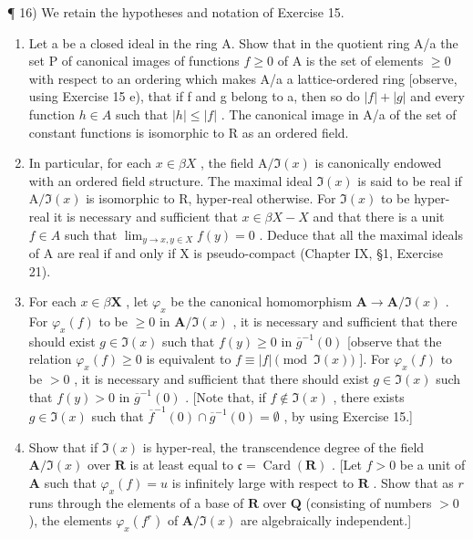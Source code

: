 ¶ 16) We retain the hypotheses and notation of Exercise 15.

\begin{enumerate}
\def\labelenumi{\alph{enumi})}
\item
  Let a be a closed ideal in the ring A. Show that in the quotient ring A/a the set P of canonical images of functions \(f \geqslant 0\) of A is the set of elements \(\geqslant 0\) with respect to an ordering which makes A/a a lattice-ordered ring {[}observe, using Exercise 15 e), that if f and g belong to a, then so do \(|f| + |g|\) and every function \(h \in A\) such that \(|h| \leqslant |f|\) . The canonical image in A/a of the set of constant functions is isomorphic to R as an ordered field.
\item
  In particular, for each \(x \in \beta X\) , the field \(\mathrm{A}/\Im(x)\) is canonically endowed with an ordered field structure. The maximal ideal \(\Im(x)\) is said to be real if \(\mathrm{A}/\Im(x)\) is isomorphic to R, hyper-real otherwise. For \(\Im(x)\) to be hyper-real it is necessary and sufficient that \(x \in \beta X - X\) and that there is a unit \(f \in A\) such that \(\lim_{y \to x, y \in X} f(y) = 0\) . Deduce that all the maximal ideals of A are real if and only if X is pseudo-compact (Chapter IX, §1, Exercise 21).
\item
  For each \(x \in \beta\mathbf{X}\) , let \(\varphi_x\) be the canonical homomorphism \(\mathbf{A} \to \mathbf{A}/\Im(x)\) . For \(\varphi_x(f)\) to be \(\geqslant 0\) in \(\mathbf{A}/\Im(x)\) , it is necessary and sufficient that there should exist \(g \in \Im(x)\) such that \(f(y) \geqslant 0\) in \(\overline{g}^{-1}(0)\) {[}observe that the relation \(\varphi_x(f) \geqslant 0\) is equivalent to \(f \equiv |f|\pmod{\Im(x)}\) {]}. For \(\varphi_x(f)\) to be \(>0\) , it is necessary and sufficient that there should exist \(g \in \Im(x)\) such that \(f(y) > 0\) in \(\overline{g}^{-1}(0)\) . {[}Note that, if \(f \notin \Im(x)\) , there exists \(g \in \Im(x)\) such that \(\overline{f}^{-1}(0) \cap \overline{g}^{-1}(0) = \emptyset\) , by using Exercise 15.{]}
\item
  Show that if \(\Im(x)\) is hyper-real, the transcendence degree of the field \(\mathbf{A}/\Im(x)\) over \(\mathbf{R}\) is at least equal to \(\mathfrak{c}=\operatorname{Card}(\mathbf{R})\) . {[}Let \(f>0\) be a unit of \(\mathbf{A}\) such that \(\varphi_x(f)=u\) is infinitely large with respect to \(\mathbf{R}\) . Show that as \(r\) runs through the elements of a base of \(\mathbf{R}\) over \(\mathbf{Q}\) (consisting of numbers \(>0\) ), the elements \(\varphi_x(f^r)\) of \(\mathbf{A}/\Im(x)\) are algebraically independent.{]}
\end{enumerate}

